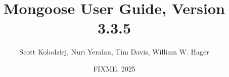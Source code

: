 \title{Mongoose User Guide, Version 3.3.5}
\author{Scott Kolodziej, Nuri Yeralan, Tim Davis, William W. Hager}
\date{FIXME, 2025}
